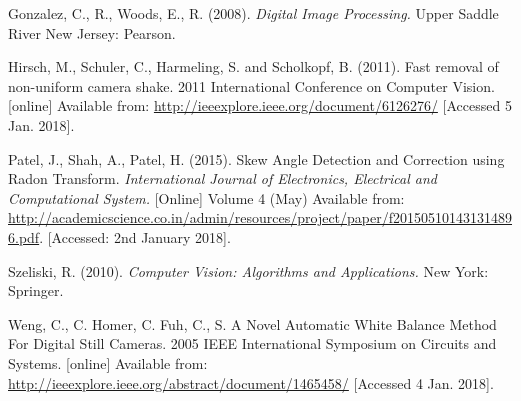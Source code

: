 \documentclass[a4paper, 12pt]{article}
\begin{document}
Gonzalez, C., R., Woods, E., R. (2008). \textit{Digital Image Processing.} Upper Saddle River New Jersey: Pearson.
\parskip 0.2in

Hirsch, M., Schuler, C., Harmeling, S. and Scholkopf, B. (2011). Fast removal of non-uniform camera shake. 2011 International Conference on Computer Vision. [online] Available from: \url{http://ieeexplore.ieee.org/document/6126276/} [Accessed 5 Jan. 2018].
\parskip 0.2in

Patel, J., Shah, A., Patel, H. (2015). Skew Angle Detection and Correction using Radon Transform. \textit{International Journal of Electronics, Electrical and Computational System.} [Online] Volume 4 (May) Available from: \url{http://academicscience.co.in/admin/resources/project/paper/f201505101431314896.pdf}. [Accessed: 2nd January 2018].
\parskip 0.2in

Szeliski, R. (2010). \textit{Computer Vision: Algorithms and Applications.} New York: Springer.
\parskip 0.2in

Weng, C., C. Homer, C. Fuh, C., S. A Novel Automatic White Balance Method For Digital Still Cameras. 2005 IEEE International Symposium on Circuits and Systems. [online] Available from: \url{http://ieeexplore.ieee.org/abstract/document/1465458/} [Accessed 4 Jan. 2018].
\end{document}
